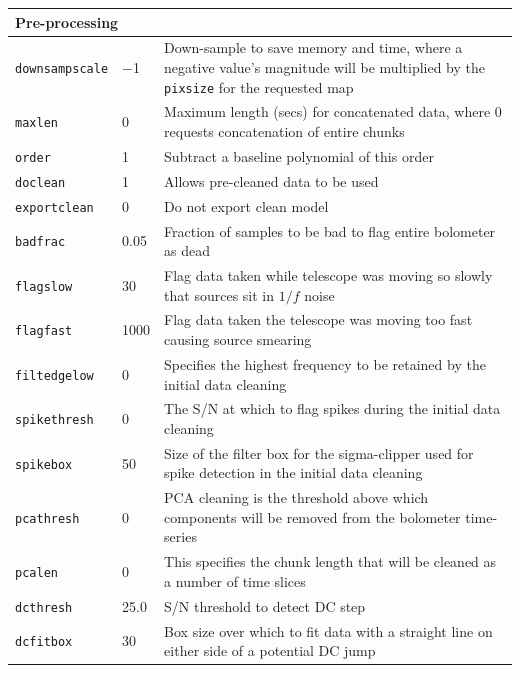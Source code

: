 \documentclass[twoside,11pt]{article}
\newenvironment{latexonly}{}{}
\renewcommand{\_}{\texttt{\symbol{95}}}
\newcommand{\param}[1]{\texttt{#1}}
\begin{document}
\begin{latexonly}
\begin{table}[h]
\begin{center}
\begin{small}
\begin{tabular}{|p{2.5cm}|p{1.0cm}|p{11.2cm}|}
\hline
\multicolumn{3}{|l|}{\textbf{Pre-processing}}\\
\hline
\param{downsampscale} & $-$1 & Down-sample to save memory and time, where a negative
                               value's magnitude will be multiplied by the
                               \param{pixsize} for the requested map \\
\param{maxlen}        &    0 & Maximum length (secs) for concatenated data, where
                               0 requests concatenation of entire chunks \\
\param{order}         &    1 & Subtract a baseline polynomial of this order \\
\param{doclean}       &    1 & Allows pre-cleaned data to be used \\
\param{exportclean}   &    0 & Do not export clean model \\
\param{badfrac}       & 0.05 & Fraction of samples to be bad to flag entire bolometer
                               as dead \\
\param{flagslow}      &   30 & Flag data taken while telescope was moving so slowly
                               that sources sit in $1/f$ noise \\
\param{flagfast}      & 1000 & Flag data taken the telescope was moving too fast
                               causing source smearing \\
\param{filt\_edgelow} &    0 & Specifies the highest frequency to be retained by the
                               initial data cleaning \\
\param{spikethresh}   &    0 & The S/N at which to flag spikes during the initial
                               data cleaning \\
\param{spikebox}      &   50 & Size of the filter box for the sigma-clipper used for
                               spike detection in the initial data cleaning \\
\param{pcathresh}     &    0 & PCA cleaning is the threshold above which components
                               will be removed from the bolometer time-series \\
\param{pcalen}        &    0 & This specifies the chunk length that will be cleaned
                               as a number of time slices \\
\param{dcthresh}      & 25.0 & S/N threshold to detect DC step \\
\param{dcfitbox}      &   30 & Box size over which to fit data with a straight
                               line on either side of a potential DC jump \\

\end{tabular}
\end{small}
\end{center}
\end{table}
\end{latexonly}
\end{document}
